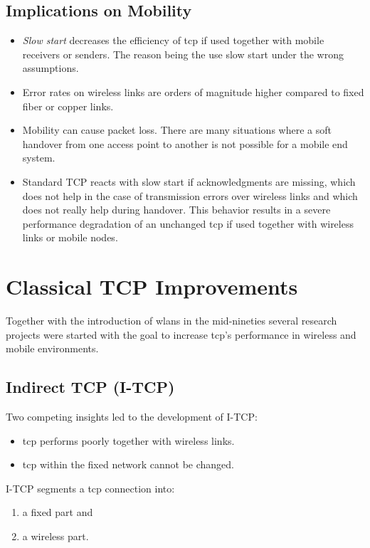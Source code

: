 \subsection{Implications on Mobility}

\begin{itemize}
	\item \textit{Slow start} decreases the efficiency of \gls{tcp} if used together with mobile receivers
	or senders. The reason being the use slow start under the wrong assumptions.
	\item Error rates on wireless links are orders of magnitude higher compared to fixed fiber or copper links.
	\item Mobility can cause packet loss. There are many situations where a soft
	handover from one access point to another is not possible for a mobile end system. 
	\item Standard TCP reacts with slow start if acknowledgments are missing, which does not help in the case of transmission errors over wireless links and which does not really help during handover. This behavior results in a severe performance degradation of an unchanged \gls{tcp} if used together with wireless links or mobile nodes.
\end{itemize}

\section{Classical TCP Improvements}
Together with the introduction of \gls{wlan}s in the mid-nineties several research projects were started with the goal to increase \gls{tcp}’s performance in wireless and mobile environments.

\subsection{Indirect TCP (I-TCP)}
Two competing insights led to the development of {I-TCP}:
\begin{itemize}
	\item \gls{tcp} performs poorly together with wireless links.
	\item \gls{tcp} within the fixed network cannot be changed.
\end{itemize}

I-TCP segments a \gls{tcp} connection into:
\begin{multicols}{2}
	\begin{enumerate}[label=\alph*)]
		\item a fixed part and
		\item a wireless part.
	\end{enumerate}
\end{multicols}


